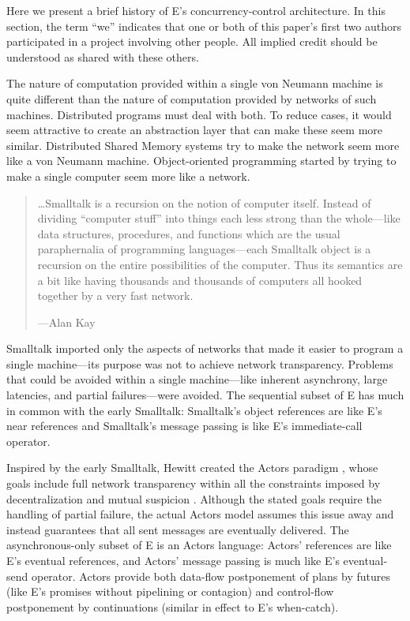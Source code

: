 \documentclass{llncs}
\begin{document}
Here we present a brief history of E's concurrency-control
architecture. In this section, the term ``we'' indicates that one or
both of this paper's first two authors participated in a project
involving other people. All implied credit should be understood as
shared with these others.

 The nature of computation provided within a single
von Neumann machine is quite different than the nature of computation
provided by networks of such machines. Distributed programs must deal
with both. To reduce cases, it would seem attractive to create an
abstraction layer that can make these seem more similar. Distributed
Shared Memory systems try to make the network seem more like a von
Neumann machine. Object-oriented programming started by trying to make
a single computer seem more like a network.
%
\begin{quotation}
\ldots Smalltalk is a recursion on the notion of computer
itself. Instead of dividing ``computer stuff'' into things each less
strong than the whole---like data structures, procedures, and
functions which are the usual paraphernalia of programming
languages---each Smalltalk object is a recursion on the entire
possibilities of the computer. Thus its semantics are a bit like
having thousands and thousands of computers all hooked together by a
very fast network.
\begin{flushright}
---Alan Kay \cite{kay:smallhistory}
\end{flushright}
\end{quotation}
%
Smalltalk imported only the aspects of networks that made it easier to
program a single machine---its purpose was not to achieve network
transparency. Problems that could be avoided within a single
machine---like inherent asynchrony, large latencies, and partial
failures---were avoided. The sequential subset of E
has much in common with the early Smalltalk: Smalltalk's object
references are like E's near references and Smalltalk's message
passing is like E's immediate-call operator.

 Inspired by the early Smalltalk, Hewitt created the
Actors paradigm \cite{hewitt:actors}, whose goals include full network
transparency within all the constraints imposed by decentralization
and mutual suspicion \cite{hewitt:challenge}. Although the stated
goals require the handling of partial failure, the actual Actors model
assumes this issue away and instead guarantees that all sent messages
are eventually delivered. The asynchronous-only subset of E is an
Actors language: Actors' references are like E's eventual references,
and Actors' message passing is much like E's eventual-send
operator. Actors provide both data-flow postponement of plans by
futures (like E's promises without pipelining or contagion) and
control-flow postponement by continuations (similar in effect to E's
when-catch).
\end{document}
